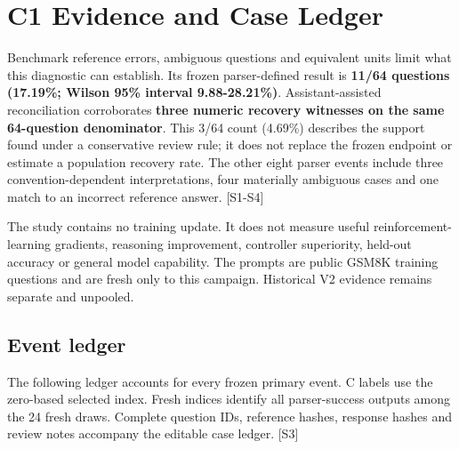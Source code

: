 \documentclass[12pt,a4paper]{report}
\begin{document}
\chapter{C1 Evidence and Case Ledger}\label{c1-evidence-and-case-ledger}

Benchmark reference errors, ambiguous questions and equivalent units
limit what this diagnostic can establish. Its frozen parser-defined
result is \textbf{11/64 questions (17.19\%; Wilson 95\% interval
9.88-28.21\%)}. Assistant-assisted reconciliation corroborates
\textbf{three numeric recovery witnesses on the same 64-question
denominator}. This 3/64 count (4.69\%) describes the support found under
a conservative review rule; it does not replace the frozen endpoint or
estimate a population recovery rate. The other eight parser events
include three convention-dependent interpretations, four materially
ambiguous cases and one match to an incorrect reference answer.
{[}S1-S4{]}

The study contains no training update. It does not measure useful
reinforcement-learning gradients, reasoning improvement, controller
superiority, held-out accuracy or general model capability. The prompts
are public GSM8K training questions and are fresh only to this campaign.
Historical V2 evidence remains separate and unpooled.

\section{Event ledger}\label{event-ledger}

The following ledger accounts for every frozen primary event. C labels
use the zero-based selected index. Fresh indices identify all
parser-success outputs among the 24 fresh draws. Complete question IDs,
reference hashes, response hashes and review notes accompany the
editable case ledger. {[}S3{]}
\end{document}
